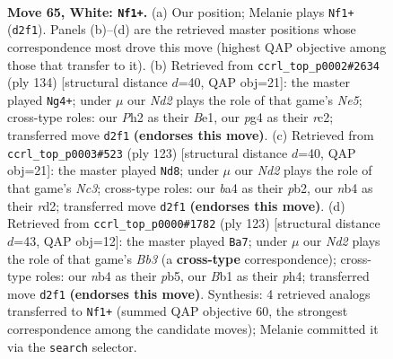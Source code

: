 \documentclass[11pt]{article}
\begin{document}
\clearpage

\begin{figure}[p]\centering
\begin{subfigure}{0.46\textwidth}\centering
\resizebox{\linewidth}{!}{%
\newchessgame
\chessboard[
  setfen={8/2r2p1p/6p1/4P3/bn3Pp1/4k1K1/3N3P/1B6 w - - 20 65},
  showmover=false,
  pgfstyle=straightmove, color=movearrow, markmove={d2-f1}
]}
\caption{}
\end{subfigure}\hfill
\begin{subfigure}{0.46\textwidth}\centering
\resizebox{\linewidth}{!}{%
\newchessgame
\chessboard[
  setfen={8/8/5k1p/4N1p1/5p2/5P1P/2r3P1/4BK2 w - - 38 68},
  showmover=false,
  pgfstyle=straightmove, color=movearrow, markmove={e5-g4}
]}
\caption{}
\end{subfigure}
\\[4pt]
\begin{subfigure}{0.46\textwidth}\centering
\resizebox{\linewidth}{!}{%
\newchessgame
\chessboard[
  setfen={8/4kp2/2n3p1/3KPb2/5P1P/8/1P1R4/8 b - - 6 62},
  showmover=false,
  pgfstyle=straightmove, color=movearrow, markmove={c6-d8}
]}
\caption{}
\end{subfigure}\hfill
\begin{subfigure}{0.46\textwidth}\centering
\resizebox{\linewidth}{!}{%
\newchessgame
\chessboard[
  setfen={8/4pp2/1b3k2/1P3P1p/6pP/1B4P1/4KP2/8 b - - 6 62},
  showmover=false,
  pgfstyle=straightmove, color=movearrow, markmove={b6-a7}
]}
\caption{}
\end{subfigure}
\caption{\textbf{Move 65, White: \texttt{Nf1+}.} (a) Our position; Melanie plays \texttt{Nf1+} (\texttt{d2f1}). Panels (b)--(d) are the retrieved master positions whose correspondence most drove this move (highest QAP objective among those that transfer to it). (b) Retrieved from \texttt{ccrl\_top\_p0002\#2634} (ply 134) [structural distance $d$=40, QAP obj=21]: the master played \texttt{Ng4+}; under $\mu$ our \emph{Nd2} plays the role of that game's \emph{Ne5}; cross-type roles: our \emph{P}h2 as their \emph{B}e1, our \emph{p}g4 as their \emph{r}c2; transferred move \texttt{d2f1} \textbf{(endorses this move)}. (c) Retrieved from \texttt{ccrl\_top\_p0003\#523} (ply 123) [structural distance $d$=40, QAP obj=21]: the master played \texttt{Nd8}; under $\mu$ our \emph{Nd2} plays the role of that game's \emph{Nc3}; cross-type roles: our \emph{b}a4 as their \emph{p}b2, our \emph{n}b4 as their \emph{r}d2; transferred move \texttt{d2f1} \textbf{(endorses this move)}. (d) Retrieved from \texttt{ccrl\_top\_p0000\#1782} (ply 123) [structural distance $d$=43, QAP obj=12]: the master played \texttt{Ba7}; under $\mu$ our \emph{Nd2} plays the role of that game's \emph{Bb3} (a \textbf{cross-type} correspondence); cross-type roles: our \emph{n}b4 as their \emph{p}b5, our \emph{B}b1 as their \emph{p}h4; transferred move \texttt{d2f1} \textbf{(endorses this move)}. Synthesis: 4 retrieved analogs transferred to \texttt{Nf1+} (summed QAP objective 60, the strongest correspondence among the candidate moves); Melanie committed it via the \texttt{search} selector.}
\label{fig:thought-m128}
\end{figure}
\end{document}
